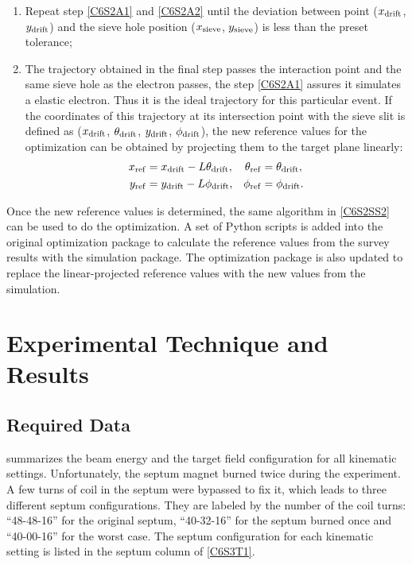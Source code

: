\begin{enumerate}[parsep=0pt]
\item Repeat step \ref{C6S2A1} and \ref{C6S2A2} until the deviation between point ($x_{\mathrm{drift}}$, $y_{\mathrm{drift}}$) and the sieve hole position ($x_{\mathrm{sieve}}$, $y_{\mathrm{sieve}}$) is less than the preset tolerance;
\item The trajectory obtained in the final step passes the interaction point and the same sieve hole as the electron passes, the step \ref{C6S2A1} assures it simulates a elastic electron. Thus it is the ideal trajectory for this particular event. If the coordinates of this trajectory at its intersection point with the sieve slit is defined as ($x_{\mathrm{drift}}$, $\theta_{\mathrm{drift}}$, $y_{\mathrm{drift}}$, $\phi_{\mathrm{drift}}$), the new reference values for the optimization can be obtained by projecting them to the target plane linearly:
\begin{align} \label{C6S2E14}
x_{\mathrm{ref}} & = x_{\mathrm{drift}}-L\theta_{\mathrm{drift}}, & \theta_{\mathrm{ref}} & = \theta_{\mathrm{drift}}, \\ \label{C6S2E15}
y_{\mathrm{ref}} & = y_{\mathrm{drift}}-L\phi_{\mathrm{drift}}, & \phi_{\mathrm{ref}} & = \phi_{\mathrm{drift}}.
\end{align}
\end{enumerate}

Once the new reference values is determined, the same algorithm in \cref{C6S2SS2} can be used to do the optimization. A set of Python scripts is added into the original optimization package to calculate the reference values from the survey results with the simulation package. The optimization package is also updated to replace the linear-projected reference values with the new values from the simulation.

\section{Experimental Technique and Results}
\label{C6S3}

\subsection{Required Data}
\label{C6S3SS1}

 summarizes the beam energy and the target field configuration for all kinematic settings. Unfortunately, the septum magnet burned twice during the experiment. A few turns of coil in the septum were bypassed to fix it, which leads to three different septum configurations. They are labeled by the number of the coil turns: ``48-48-16'' for the original septum, ``40-32-16'' for the septum burned once and ``40-00-16'' for the worst case. The septum configuration for each kinematic setting is listed in the septum column of \cref{C6S3T1}.

